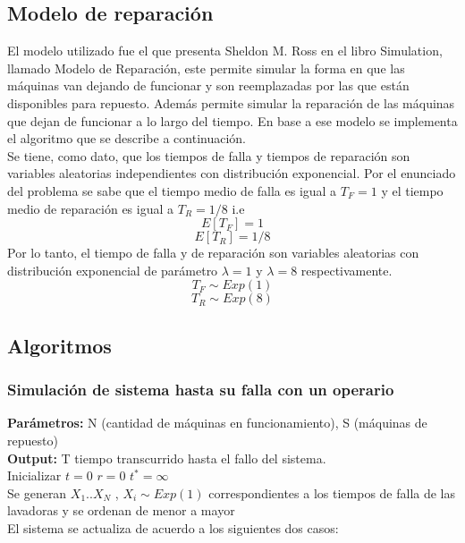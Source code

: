 \documentclass[11pt, spanish, a4paper]{article}
\begin{document}
\subsection{Modelo de reparaci\'on}
El modelo utilizado fue el que presenta Sheldon M. Ross en el libro Simulation, llamado Modelo de Reparación, este permite simular la forma en que las m\'aquinas van dejando de funcionar y son reemplazadas por las que están disponibles para repuesto. Adem\'as permite simular la reparaci\'on de las m\'aquinas que dejan de funcionar a lo largo del tiempo. En base a ese modelo se implementa el algoritmo que se describe a continuaci\'on.\\

Se tiene, como dato, que los tiempos de falla y tiempos de reparación son variables aleatorias independientes con distribución exponencial. Por el enunciado del problema se sabe que el tiempo medio de falla es igual a $T_F = 1 $ y el tiempo medio de reparación es igual a $T_R = 1/8$ i.e  $$E[T_F] = 1$$  $$E[T_R] = 1/8$$ 
Por lo tanto, el tiempo de falla y de reparaci\'on son variables aleatorias con distribuci\'on exponencial de par\'ametro $ \lambda = 1 $ y $\lambda = 8$ respectivamente. 
$$T_F \sim Exp(1)$$
$$T_R \sim Exp(8)$$
\pagebreak
\subsection{Algoritmos}
\subsubsection{Simulaci\'on de sistema hasta su falla con un operario}
\textbf{Par\'ametros:} N (cantidad de m\'aquinas en funcionamiento), S (m\'aquinas de repuesto)\\
\textbf{Output: }T tiempo transcurrido hasta el fallo del sistema.\\
Inicializar $t=0$ $r=0$ $t^*=\infty $ \\
Se generan $X_1 .. X_N$ , $X_i \sim Exp(1)$ correspondientes a los tiempos de falla de las lavadoras y se ordenan de menor a mayor\\
El sistema se actualiza de acuerdo a los siguientes dos casos:
\end{document}

